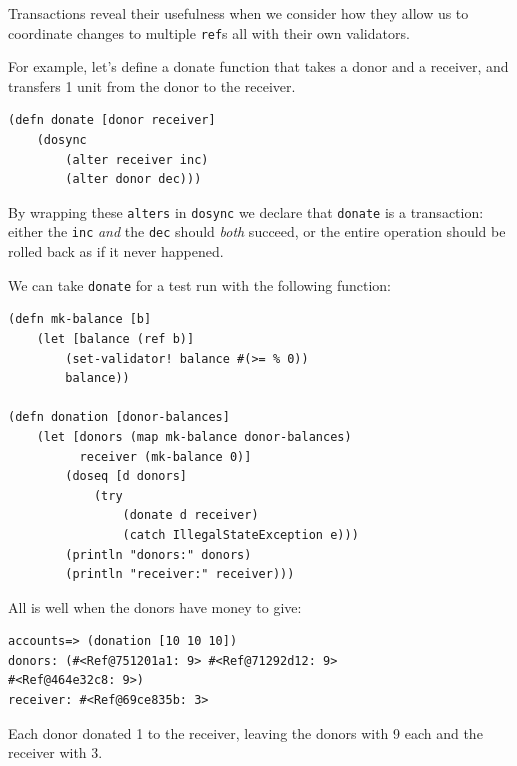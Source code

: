 \documentclass[a4paper,12pt]{kth-mag}
\begin{document}
Transactions reveal their usefulness when we consider how they allow us to coordinate changes to multiple \texttt{ref}s all with their own validators.

For example, let's define a donate function that takes a donor and a receiver, and transfers 1 unit from the donor to the receiver.

\begin{listing}[H]
	\begin{verbatim}
(defn donate [donor receiver]
    (dosync 
        (alter receiver inc)
        (alter donor dec)))
	\end{verbatim}
\end{listing}

By wrapping these \texttt{alters} in \texttt{dosync} we declare that \texttt{donate} is a transaction: either the \texttt{inc} \textit{and} the \texttt{dec} should \textit{both} succeed, or the entire operation should be rolled back as if it never happened. 

We can take \texttt{donate} for a test run with the following function:

\begin{listing}[H]
	\begin{verbatim}
(defn mk-balance [b]
    (let [balance (ref b)]
        (set-validator! balance #(>= % 0))
        balance))

(defn donation [donor-balances]
    (let [donors (map mk-balance donor-balances)
          receiver (mk-balance 0)]
        (doseq [d donors]  
            (try 
                (donate d receiver)
                (catch IllegalStateException e)))
        (println "donors:" donors)
        (println "receiver:" receiver)))
	\end{verbatim}
\end{listing}

All is well when the donors have money to give:

\begin{listing}[H]
	\begin{verbatim}
accounts=> (donation [10 10 10])
donors: (#<Ref@751201a1: 9> #<Ref@71292d12: 9> 
#<Ref@464e32c8: 9>)
receiver: #<Ref@69ce835b: 3>
	\end{verbatim}
\end{listing}

Each donor donated 1 to the receiver, leaving the donors with 9 each and the receiver with 3.
\end{document}

